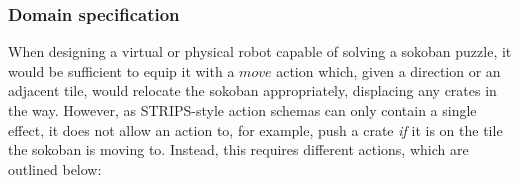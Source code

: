 \documentclass[../Master.tex]{subfiles}
\begin{document}
\graphicspath{{.../Graphics/}}

%
%
%
%

\subsubsection*{Domain specification}
When designing a virtual or physical robot capable of solving a sokoban puzzle, it would be sufficient to equip it with a $move$ action which, given a direction or an adjacent tile, would relocate the sokoban appropriately, displacing any crates in the way. However, as STRIPS-style action schemas can only contain a single effect, it does not allow an action to, for example, push a crate \textit{if}  it is on the tile the sokoban is moving to. Instead, this requires different actions, which are outlined below:
\end{document}
